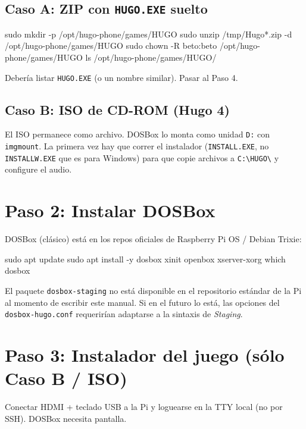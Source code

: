 \subsection{Caso A: ZIP con \texttt{HUGO.EXE} suelto}

\begin{shellcode}
sudo mkdir -p /opt/hugo-phone/games/HUGO
sudo unzip /tmp/Hugo*.zip -d /opt/hugo-phone/games/HUGO
sudo chown -R beto:beto /opt/hugo-phone/games/HUGO
ls /opt/hugo-phone/games/HUGO/
\end{shellcode}

Debería listar \texttt{HUGO.EXE} (o un nombre similar). Pasar al Paso 4.

\subsection{Caso B: ISO de CD-ROM (Hugo 4)}

El ISO permanece como archivo. DOSBox lo monta como unidad \texttt{D:} con \texttt{imgmount}. La primera vez hay que correr el instalador (\texttt{INSTALL.EXE}, no \texttt{INSTALLW.EXE} que es para Windows) para que copie archivos a \texttt{C:\textbackslash{}HUGO\textbackslash{}} y configure el audio.

\section{Paso 2: Instalar DOSBox}

DOSBox (clásico) está en los repos oficiales de Raspberry Pi OS / Debian Trixie:

\begin{shellcode}
sudo apt update
sudo apt install -y dosbox xinit openbox xserver-xorg
which dosbox
\end{shellcode}

\begin{nota}
El paquete \texttt{dosbox-staging} no está disponible en el repositorio estándar de la Pi al momento de escribir este manual. Si en el futuro lo está, las opciones del \texttt{dosbox-hugo.conf} requerirían adaptarse a la sintaxis de \emph{Staging}.
\end{nota}

\section{Paso 3: Instalador del juego (sólo Caso B / ISO)}

Conectar HDMI + teclado USB a la Pi y loguearse en la TTY local (no por SSH). DOSBox necesita pantalla.

